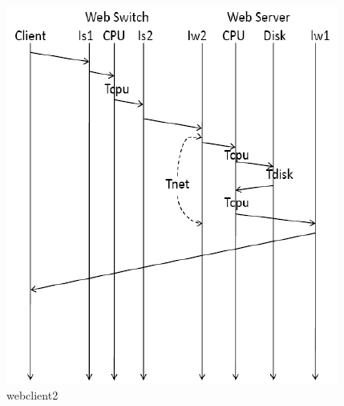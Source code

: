 \begin{figure}[H]
\begin{center}
\includegraphics[scale=0.62]{etc/webclient2.png}
\caption{webclient2}
\label{webclient2}
\end{center}
\end{figure}

